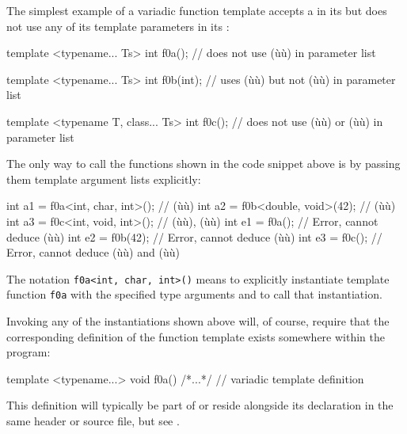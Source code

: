 The simplest example of a variadic function template accepts a
 in its  but does not use any of its template parameters in its
:

\begin{emcppslisting}[emcppsbatch=e13]
template <typename... Ts>
int f0a();     // does not use (ù{}ù) in parameter list

template <typename... Ts>
int f0b(int);  // uses (ù{}ù) but not (ù{}ù) in parameter list

template <typename T, class... Ts>
int f0c();     // does not use (ù{}ù) or (ù{}ù) in parameter list
\end{emcppslisting}
    

\noindent The only way to call the functions shown in the code snippet above is by
passing them template argument lists explicitly:

\begin{emcppslisting}[emcppsbatch=e13]
int a1 = f0a<int, char, int>();  // (ù{}ù)
int a2 = f0b<double, void>(42);  // (ù{}ù)
int a3 = f0c<int, void, int>();  // (ù{}ù), (ù{}ù)
int e1 = f0a();                  // Error, cannot deduce (ù{}ù)
int e2 = f0b(42);                // Error, cannot deduce (ù{}ù)
int e3 = f0c();                  // Error, cannot deduce (ù{}ù) and (ù{}ù)
\end{emcppslisting}
    

\noindent The notation \lstinline!f0a<int,!~\lstinline!char,!~\lstinline!int>()! means to
explicitly instantiate template function \lstinline!f0a! with the specified
type arguments and to call that instantiation.

Invoking any of the instantiations shown above will, of course, require
that the corresponding definition of the function template exists
somewhere within the program:

\begin{emcppslisting}
template <typename...> void f0a() { /*...*/ }  // variadic template definition
\end{emcppslisting}
    

\noindent This definition will typically be part of or reside alongside its
declaration in the same header or source file, but see
.

